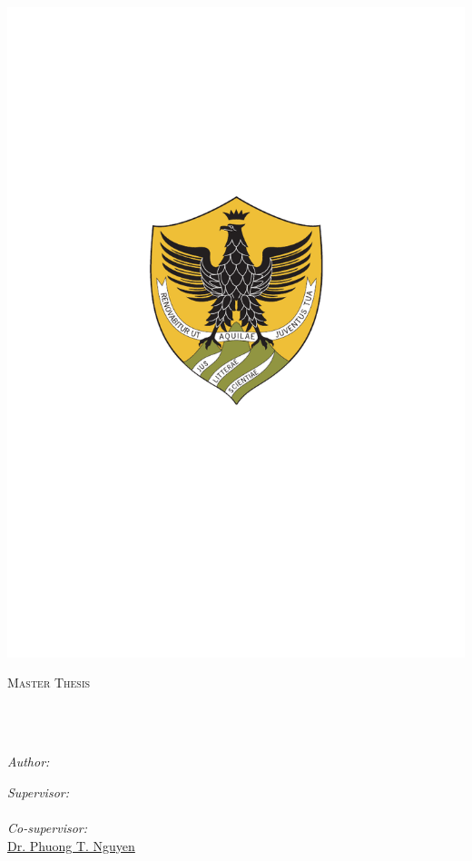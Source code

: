 \documentclass[
11pt, %
english, %
singlespacing, %
headsepline, %
]{MastersDoctoralThesis} %
\author{Riccardo \textsc{Rubei}} %
\begin{document}
\frontmatter %

\pagestyle{plain} %





	\begin{titlepage}
		\begin{center}
			
			\vspace*{.06\textheight}
			
			\includegraphics[width=0.2\linewidth]{images/univaq}
			
			{\scshape\LARGE \univname\par}\vspace{1.5cm} %
			\textsc{\Large Master Thesis}\\[0.5cm] %
			
			\HRule \\[0.4cm] %
			{\huge \bfseries \ttitle\par}\vspace{0.4cm} %
			\HRule \\[1.5cm] %
			
			\begin{minipage}[t]{0.4\textwidth}
				\begin{flushleft} \large
					\emph{Author:}\\
					\href{http://www.johnsmith.com}{\authorname} %
				\end{flushleft}
			\end{minipage}
			\begin{minipage}[t]{0.4\textwidth}
				\begin{flushright} \large
					\emph{Supervisor:} \\
					\href{http://www.di.univaq.it/diruscio/index.php}{\supname} \\%
					\emph{Co-supervisor:}\\
					\href{https://github.com/phuongthanhnguyen}{Dr. Phuong T. Nguyen} %
				\end{flushright}
			\end{minipage}\\[2.5cm]
			

\end{center}
\end{titlepage}
\end{document}

